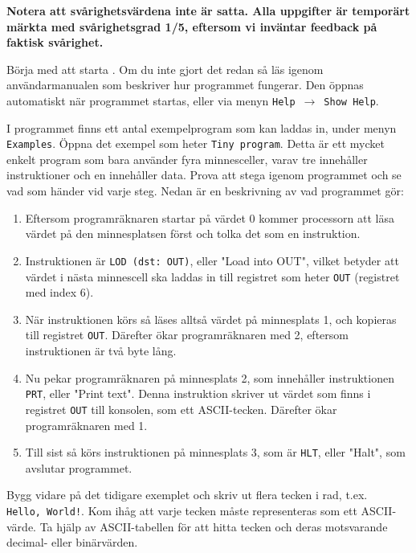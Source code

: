\halfblankline
\noindent\textbf{Notera att svårighetsvärdena inte är satta. Alla uppgifter är temporärt märkta med svårighetsgrad 1/5, eftersom vi inväntar feedback på faktisk svårighet.}

\begin{Datorarbete}
    \item {} Börja med att starta \progname{}. Om du inte gjort det redan så läs igenom användarmanualen som beskriver hur programmet fungerar. Den öppnas automatiskt när programmet startas, eller via menyn \texttt{Help}~$\rightarrow$~\texttt{Show Help}.

    \item {} I programmet finns ett antal exempelprogram som kan laddas in, under menyn \texttt{Examples}. Öppna det exempel som heter \texttt{Tiny program}. Detta är ett mycket enkelt program som bara använder fyra minnesceller, varav tre innehåller instruktioner och en innehåller data. Prova att stega igenom programmet och se vad som händer vid varje steg. Nedan är en beskrivning av vad programmet gör:
    \begin{enumerate}
        \item Eftersom programräknaren startar på värdet 0 kommer processorn att läsa värdet på den minnesplatsen först och tolka det som en instruktion.
        \item Instruktionen är \texttt{LOD (dst: OUT)}, eller "Load into OUT", vilket betyder att värdet i nästa minnescell ska laddas in till registret som heter \texttt{OUT} (registret med index 6).
        \item När instruktionen körs så läses alltså värdet på minnesplats 1, och kopieras till registret \texttt{OUT}. Därefter ökar programräknaren med 2, eftersom instruktionen är två byte lång.
        \item Nu pekar programräknaren på minnesplats 2, som innehåller instruktionen \texttt{PRT}, eller "Print text". Denna instruktion skriver ut värdet som finns i registret \texttt{OUT} till konsolen, som ett ASCII-tecken. Därefter ökar programräknaren med 1.
        \item Till sist så körs instruktionen på minnesplats 3, som är \texttt{HLT}, eller "Halt", som avslutar programmet.
    \end{enumerate}

    \item {} Bygg vidare på det tidigare exemplet och skriv ut flera tecken i rad, t.ex. \texttt{Hello,~World!}. Kom ihåg att varje tecken måste representeras som ett ASCII-värde. Ta hjälp av ASCII-tabellen för att hitta tecken och deras motsvarande decimal- eller binärvärden.


\end{Datorarbete}
